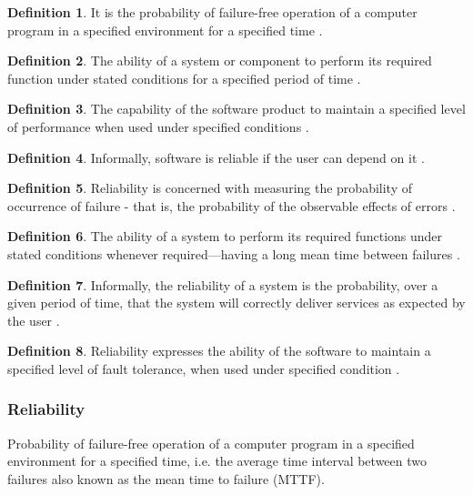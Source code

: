 \documentclass[letterpaper, cleveref]{lipics-v2019}
\theoremstyle{definition}
\newtheorem{defn}{Definition}
\begin{document}
\begin{defn} \label{reliabilitySelected1} It is the probability of failure-free
  operation of a computer program in a specified environment for a specified
  time \citep{musa1987software}.
\end{defn}

\begin{defn}
  The ability of a system or component to perform its required function under
  stated conditions for a specified period of time
  \citep{IEEEComputerDictionary1991}.
\end{defn}

\begin{defn}
 The capability of the software product to maintain a specified level of
 performance when used under specified conditions \cite{ISO9126}. %
\end{defn}

\begin{defn}
  Informally, software is reliable if the user can depend on it
  \citep{GhezziEtAl2003}.
\end{defn}

\begin{defn} \label{reliabilitySelected2} Reliability is concerned with
	measuring the probability of occurrence of failure - that is, the probability
	of the observable effects of errors \citep{GhezziEtAl2003}.
\end{defn}

\begin{defn}
  The ability of a system to perform its required functions under stated
  conditions whenever required—having a long mean time between failures
  \citep{mcconnell2004code}.
\end{defn}

\begin{defn}
  Informally, the reliability of a system is the probability, over a given
  period of time, that the system will correctly deliver services as expected by
  the user \citep{sommerville}. %
\end{defn}

\begin{defn}
  Reliability expresses the ability of the software to maintain a specified
  level of fault tolerance, when used under specified condition
  \citep{singh2013different}.
\end{defn}

\begin{mybox}
\subsubsection*{Reliability}
Probability of failure-free operation of a computer program in a specified
environment for a specified time, i.e. the average time interval between two
failures also known as the mean time to failure (MTTF).
\end{mybox}
\end{document}
